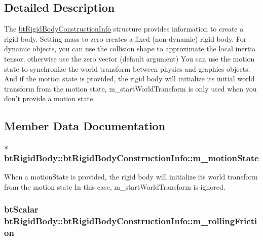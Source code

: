 \subsection{Detailed Description}
The \hyperlink{structbt_rigid_body_1_1bt_rigid_body_construction_info}{btRigidBodyConstructionInfo} structure provides information to create a rigid body. Setting mass to zero creates a fixed (non-dynamic) rigid body. For dynamic objects, you can use the collision shape to approximate the local inertia tensor, otherwise use the zero vector (default argument) You can use the motion state to synchronize the world transform between physics and graphics objects. And if the motion state is provided, the rigid body will initialize its initial world transform from the motion state, m\_\-startWorldTransform is only used when you don't provide a motion state. 

\subsection{Member Data Documentation}
\hypertarget{structbt_rigid_body_1_1bt_rigid_body_construction_info_729b0b79412f36ac983d4adafbffa429}{
\subsubsection[m\_\-motionState]{$\ast$ {\bf btRigidBody::btRigidBodyConstructionInfo::m\_\-motionState}}}
\label{structbt_rigid_body_1_1bt_rigid_body_construction_info_729b0b79412f36ac983d4adafbffa429}


When a motionState is provided, the rigid body will initialize its world transform from the motion state In this case, m\_\-startWorldTransform is ignored. \hypertarget{structbt_rigid_body_1_1bt_rigid_body_construction_info_bb72d0a00d035d2224a927810e9ed972}{
\subsubsection[m\_\-rollingFriction]{\setlength{\rightskip}{0pt plus 5cm}btScalar {\bf btRigidBody::btRigidBodyConstructionInfo::m\_\-rollingFriction}}}
\label{structbt_rigid_body_1_1bt_rigid_body_construction_info_bb72d0a00d035d2224a927810e9ed972}


